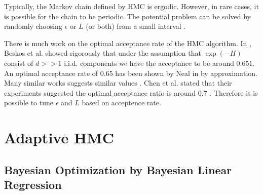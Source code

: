 \documentclass{article} %
\begin{document}
Typically, the Markov chain defined by HMC is ergodic. However, in rare cases, it is possible for the chain to be periodic. The potential problem can be solved by randomly choosing $\epsilon$ or $L$ (or both) from a small interval \cite{mackenzie1989improved}.

There is much work on the optimal acceptance rate of the HMC algorithm. In \cite{beskos2010optimal}, Beskos et al. showed rigorously that under the assumption that $\exp(-H)$ consist of $d >> 1$ i.i.d. components we have the acceptance to be around $0.651$. An optimal acceptance rate of 0.65 has been shown by Neal in \cite{neal2010mcmc} by approximation. Many similar works suggests similar values \cite{creutz1988global} \cite{sexton1992hamiltonian} \cite{kennedy1991acceptances}. Chen et al. stated that their experiments suggested the optimal acceptance ratio is around 0.7 \cite{chen2001exploring}. Therefore it is possible to tune $\epsilon$ and $L$ based on acceptence rate.

\section{Adaptive HMC}

\subsection{Bayesian Optimization by Bayesian Linear Regression}



\small{
{}

}
\end{document}
